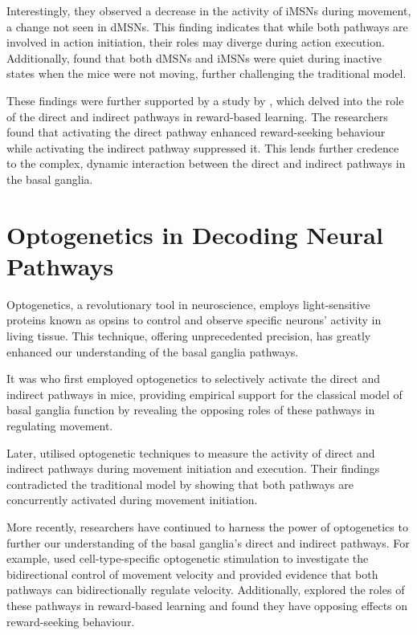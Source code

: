 \documentclass[10pt]{article}
\begin{document}
\begin{sloppypar}
  Interestingly, they observed a decrease in the activity of iMSNs during movement, a change not seen in dMSNs. This finding indicates that while both pathways are involved in action initiation, their roles may diverge during action execution. Additionally, \cite{cui_concurrent_2013} found that both dMSNs and iMSNs were quiet during inactive states when the mice were not moving, further challenging the traditional model.

  These findings were further supported by a study by \cite{guillaumin_optogenetic_2020}, which delved into the role of the direct and indirect pathways in reward-based learning. The researchers found that activating the direct pathway enhanced reward-seeking behaviour while activating the indirect pathway suppressed it. This lends further credence to the complex, dynamic interaction between the direct and indirect pathways in the basal ganglia.

  \section{Optogenetics in Decoding Neural Pathways}
  \label{sec:the-role-of-optogenetics-in-neural-pathways}

  Optogenetics, a revolutionary tool in neuroscience, employs light-sensitive proteins known as opsins to control and observe specific neurons’ activity in living tissue. This technique, offering unprecedented precision, has greatly enhanced our understanding of the basal ganglia pathways.

  It was \cite{kravitz_regulation_2010} who first employed optogenetics to selectively activate the direct and indirect pathways in mice, providing empirical support for the classical model of basal ganglia function by revealing the opposing roles of these pathways in regulating movement.

  Later, \cite{cui_concurrent_2013} utilised optogenetic techniques to measure the activity of direct and indirect pathways during movement initiation and execution. Their findings contradicted the traditional model by showing that both pathways are concurrently activated during movement initiation.

  More recently, researchers have continued to harness the power of optogenetics to further our understanding of the basal ganglia’s direct and indirect pathways. For example, \cite{yttri_opponent_2016} used cell-type-specific optogenetic stimulation to investigate the bidirectional control of movement velocity and provided evidence that both pathways can bidirectionally regulate velocity. Additionally, \cite{guillaumin_optogenetic_2020} explored the roles of these pathways in reward-based learning and found they have opposing effects on reward-seeking behaviour.


\end{sloppypar}
\end{document}
